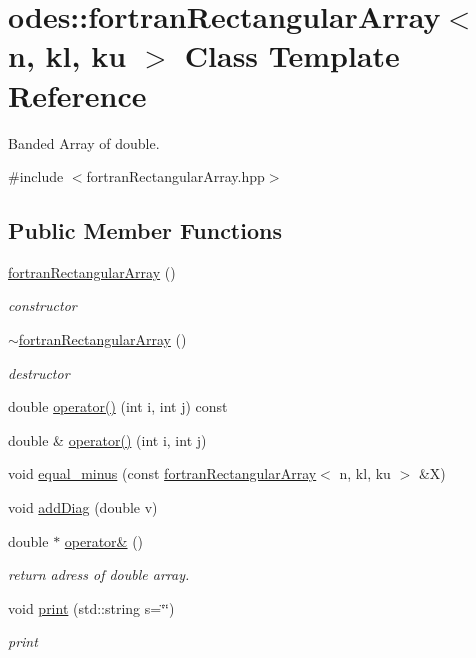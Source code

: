 \hypertarget{classodes_1_1fortranRectangularArray}{\section{odes\-:\-:fortran\-Rectangular\-Array$<$ n, kl, ku $>$ Class Template Reference}
\label{classodes_1_1fortranRectangularArray}
}


Banded Array of double.  




{\ttfamily \#include $<$fortran\-Rectangular\-Array.\-hpp$>$}

\subsection*{Public Member Functions}
\begin{DoxyCompactItemize}
\item 
\hyperlink{classodes_1_1fortranRectangularArray_afc21433e23b1f87f081c16aad69797c3}{fortran\-Rectangular\-Array} ()
\begin{DoxyCompactList}\small\item\em constructor \end{DoxyCompactList}\item 
\hyperlink{classodes_1_1fortranRectangularArray_aa8107277abfee9bd62a6f985d5b0eb5e}{$\sim$fortran\-Rectangular\-Array} ()
\begin{DoxyCompactList}\small\item\em destructor \end{DoxyCompactList}\item 
double \hyperlink{classodes_1_1fortranRectangularArray_a78270346dfd3c729d8af92ff844cb636}{operator()} (int i, int j) const 
\item 
double \& \hyperlink{classodes_1_1fortranRectangularArray_a96a5a86a0aae4febde3e840cd838fa23}{operator()} (int i, int j)
\item 
void \hyperlink{classodes_1_1fortranRectangularArray_a68b23264bb323bb535829b37bdb77d56}{equal\-\_\-minus} (const \hyperlink{classodes_1_1fortranRectangularArray}{fortran\-Rectangular\-Array}$<$ n, kl, ku $>$ \&X)
\item 
void \hyperlink{classodes_1_1fortranRectangularArray_aab169d24979d69fbb20a50cca6594e8b}{add\-Diag} (double v)
\item 
double $\ast$ \hyperlink{classodes_1_1fortranRectangularArray_ad76acc043e0630c1a14f4eb4dafe2ec4}{operator\&} ()
\begin{DoxyCompactList}\small\item\em return adress of double array. \end{DoxyCompactList}\item 
void \hyperlink{classodes_1_1fortranRectangularArray_ae4731c4daef1ead6bd0e49734c248442}{print} (std\-::string s=\char`\"{}\char`\"{})
\begin{DoxyCompactList}\small\item\em print \end{DoxyCompactList}\end{DoxyCompactItemize}
